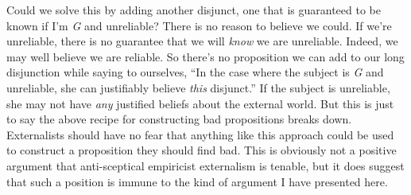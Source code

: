 Could we solve this by adding another disjunct, one that is guaranteed to be known if I'm \textit{G} and unreliable? There is no reason to believe we could. If we're unreliable, there is no guarantee that we will \textit{know} we are unreliable. Indeed, we may well believe we are reliable. So there's no proposition we can add to our long disjunction while saying to ourselves, ``In the case where the subject is \textit{G} and unreliable, she can justifiably believe \textit{this} disjunct.'' If the subject is unreliable, she may not have \textit{any} justified beliefs about the external world. But this is just to say the above recipe for constructing bad propositions breaks down. Externalists should have no fear that anything like this approach could be used to construct a proposition they should find bad. This is obviously not a positive argument that anti-sceptical empiricist externalism is tenable, but it does suggest that such a position is immune to the kind of argument I have presented here.
